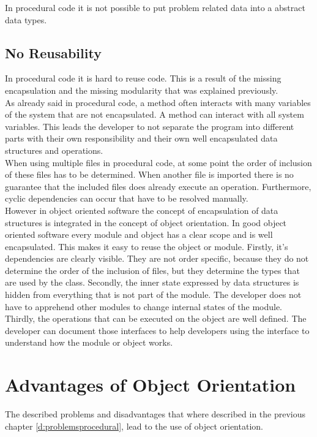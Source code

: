 In procedural code it is not possible to put problem related data into a abstract data types.

\subsection*{No Reusability}
In procedural code it is hard to reuse code. This is a result of the missing encapsulation and the missing modularity that was explained previously.\\

As already said in procedural code, a method often interacts with many variables of the system that are not encapsulated. A method can interact with all system variables. This leads the developer to not separate the program into different parts with their own responsibility and their own well encapsulated data structures and operations. \\

When using multiple files in procedural code, at some point the order of inclusion of these files has to be determined. When another file is imported there is no guarantee that the included files does already execute an operation. Furthermore, cyclic dependencies can occur that have to be resolved manually. \\

However in object oriented software the concept of encapsulation of data structures is integrated in the concept of object orientation.  In good object oriented software every module and object has a clear scope and is well encapsulated. This makes it easy to reuse the object or module. Firstly, it's dependencies are clearly visible. They are not order specific, because they do not determine the order of the inclusion of files, but they determine the types that are used by the class. Secondly, the inner state expressed by data structures is hidden from everything that is not part of the module. The developer does not have to apprehend other modules to change internal states of the module. Thirdly, the operations that can be executed on the object are well defined. The developer can document those interfaces to help developers using the interface to understand how the module or object works.

\section{Advantages of Object Orientation}
The described problems and disadvantages that where described in the previous chapter \ref{d:problemsprocedural}, lead to the use of object orientation. 


